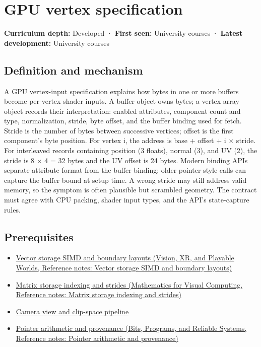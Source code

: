 \hypertarget{appendix-749ba51a6c25}{}\label{referencestart:appendix-749ba51a6c25}
\section{GPU vertex specification}\label{appendix-749ba51a6c25-gpu-vertex-specification}

\textbf{Curriculum depth:} Developed · \textbf{First seen:} University courses · \textbf{Latest development:} University courses

\subsection{Definition and mechanism}\label{appendix-749ba51a6c25-definition-and-mechanism}

A GPU vertex-input specification explains how bytes in one or more buffers become per-vertex shader inputs. A buffer object owns bytes; a vertex array object records their interpretation: enabled attributes, component count and type, normalization, stride, byte offset, and the buffer binding used for fetch. Stride is the number of bytes between successive vertices; offset is the first component's byte position. For vertex i, the address is base + offset + i × stride. For interleaved records containing position (3 floats), normal (3), and UV (2), the stride is 8 × 4 = 32 bytes and the UV offset is 24 bytes. Modern binding APIs separate attribute format from the buffer binding; older pointer-style calls can capture the buffer bound at setup time. A wrong stride may still address valid memory, so the symptom is often plausible but scrambled geometry. The contract must agree with CPU packing, shader input types, and the API's state-capture rules.

\subsection{Prerequisites}\label{appendix-749ba51a6c25-prerequisites}

\begin{itemize}
\tightlist
\item
  \href{../07-Vision-XR-and-Playable-Worlds/main.pdf\#nameddest=appendix-26bf6bf2fb8b}{Vector storage SIMD and boundary layouts (Vision, XR, and Playable Worlds, Reference notes: Vector storage SIMD and boundary layouts)}
\item
  \href{../02-Mathematics-for-Visual-Computing/main.pdf\#nameddest=appendix-ffdc1d4e5350}{Matrix storage indexing and strides (Mathematics for Visual Computing, Reference notes: Matrix storage indexing and strides)}
\item
  \hyperref[appendix-1c07d64f5e70]{Camera view and clip-space pipeline}
\item
  \href{../01-Bits-Programs-and-Reliable-Systems/main.pdf\#nameddest=appendix-6af5921bc853}{Pointer arithmetic and provenance (Bits, Programs, and Reliable Systems, Reference notes: Pointer arithmetic and provenance)}
\end{itemize}

